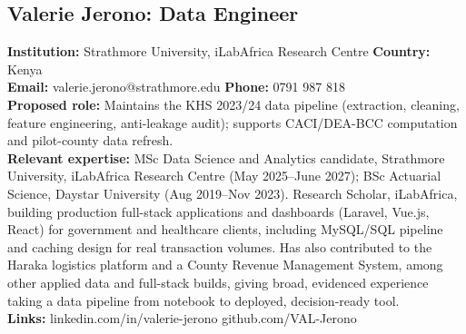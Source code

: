 \documentclass[12pt,a4paper]{article}
\begin{document}
\subsection*{Valerie Jerono: Data Engineer}
\textbf{Institution:} Strathmore University, iLabAfrica Research Centre \quad \textbf{Country:} Kenya \\
\textbf{Email:} valerie.jerono@strathmore.edu \quad \textbf{Phone:} 0791 987 818 \\
\textbf{Proposed role:} Maintains the KHS 2023/24 data pipeline (extraction, cleaning, feature engineering, anti-leakage audit); supports CACI/DEA-BCC computation and pilot-county data refresh. \\
\textbf{Relevant expertise:} MSc Data Science and Analytics candidate, Strathmore University, iLabAfrica Research Centre (May 2025--June 2027); BSc Actuarial Science, Daystar University (Aug 2019--Nov 2023). Research Scholar, iLabAfrica, building production full-stack applications and dashboards (Laravel, Vue.js, React) for government and healthcare clients, including MySQL/SQL pipeline and caching design for real transaction volumes. Has also contributed to the Haraka logistics platform and a County Revenue Management System, among other applied data and full-stack builds, giving broad, evidenced experience taking a data pipeline from notebook to deployed, decision-ready tool. \\
\textbf{Links:} linkedin.com/in/valerie-jerono \quad github.com/VAL-Jerono
\end{document}
